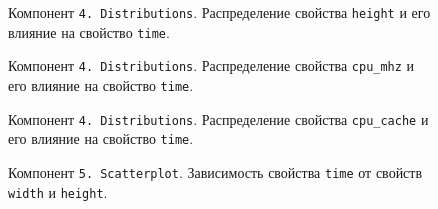 \begin{figure}[H]
    \caption{Компонент \texttt{4.\,Distributions}. Распределение свойства \texttt{height} и его влияние на свойство \texttt{time}.}
    \label{img:4-Distributions-height}
\end{figure}

\begin{figure}[H]
    \caption{Компонент \texttt{4.\,Distributions}. Распределение свойства \texttt{cpu_mhz} и его влияние на свойство \texttt{time}.}
    \label{img:4-Distributions-cpu_mhz}
\end{figure}

\begin{figure}[H]
    \caption{Компонент \texttt{4.\,Distributions}. Распределение свойства \texttt{cpu_cache} и его влияние на свойство \texttt{time}.}
    \label{img:4-Distributions-cpu_cache}
\end{figure}

\begin{figure}[H]
    \caption{Компонент \texttt{5.\,Scatterplot}. Зависимость свойства \texttt{time} от свойств \texttt{width} и \texttt{height}.}
    \label{img:5-Scatterplot}
\end{figure}